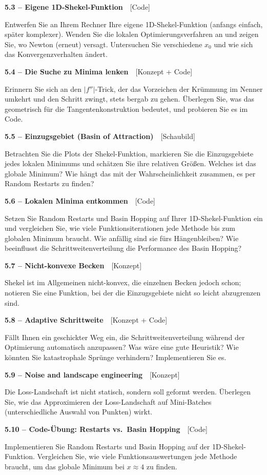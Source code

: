 \documentclass[a4paper,10pt]{article}
\newcommand{\aufg}[2]{%
  \par\vspace{3pt}
  {\bfseries\color{accent2} #1}~~{\footnotesize\color{accent2}[#2]}\par\vspace{1pt}}
\begin{document}
\aufg{5.3 \;--\; Eigene 1D-Shekel-Funktion}{Code}
Entwerfen Sie an Ihrem Rechner Ihre eigene 1D-Shekel-Funktion (anfangs einfach, später
komplexer). Wenden Sie die lokalen Optimierungsverfahren an und zeigen Sie, wo Newton
(erneut) versagt. Untersuchen Sie verschiedene $x_0$ und wie sich das
Konvergenzverhalten ändert.

\aufg{5.4 \;--\; Die Suche zu Minima lenken}{Konzept + Code}
Erinnern Sie sich an den $|f''|$-Trick, der das Vorzeichen der Krümmung im Nenner
umkehrt und den Schritt zwingt, stets bergab zu gehen. Überlegen Sie, was das
geometrisch für die Tangentenkonstruktion bedeutet, und probieren Sie es im Code.

\aufg{5.5 \;--\; Einzugsgebiet (Basin of Attraction)}{Schaubild}
Betrachten Sie die Plots der Shekel-Funktion, markieren Sie die Einzugsgebiete jedes
lokalen Minimums und schätzen Sie ihre relativen Größen. Welches ist das globale
Minimum? Wie hängt das mit der Wahrscheinlichkeit zusammen, es per Random Restarts zu
finden?

\aufg{5.6 \;--\; Lokalen Minima entkommen}{Code}
Setzen Sie Random Restarts und Basin Hopping auf Ihrer 1D-Shekel-Funktion ein und
vergleichen Sie, wie viele Funktionsiterationen jede Methode bis zum globalen Minimum
braucht. Wie anfällig sind sie fürs Hängenbleiben? Wie beeinflusst die
Schrittweitenverteilung die Performance des Basin Hopping?

\aufg{5.7 \;--\; Nicht-konvexe Becken}{Konzept}
Shekel ist im Allgemeinen nicht-konvex, die einzelnen Becken jedoch schon; notieren
Sie eine Funktion, bei der die Einzugsgebiete nicht so leicht abzugrenzen sind.

\aufg{5.8 \;--\; Adaptive Schrittweite}{Konzept + Code}
Fällt Ihnen ein geschickter Weg ein, die Schrittweitenverteilung während der
Optimierung automatisch anzupassen? Was wäre eine gute Heuristik? Wie könnten Sie
katastrophale Sprünge verhindern? Implementieren Sie es.

\aufg{5.9 \;--\; Noise and landscape engineering}{Konzept}
Die Loss-Landschaft ist nicht statisch, sondern soll geformt werden. Überlegen Sie,
wie das Approximieren der Loss-Landschaft auf Mini-Batches (unterschiedliche Auswahl
von Punkten) wirkt.

\aufg{5.10 \;--\; Code-Übung: Restarts vs.\ Basin Hopping}{Code}
Implementieren Sie Random Restarts und Basin Hopping auf der 1D-Shekel-Funktion.
Vergleichen Sie, wie viele Funktionsauswertungen jede Methode braucht, um das globale
Minimum bei $x\approx4$ zu finden.
\end{document}
